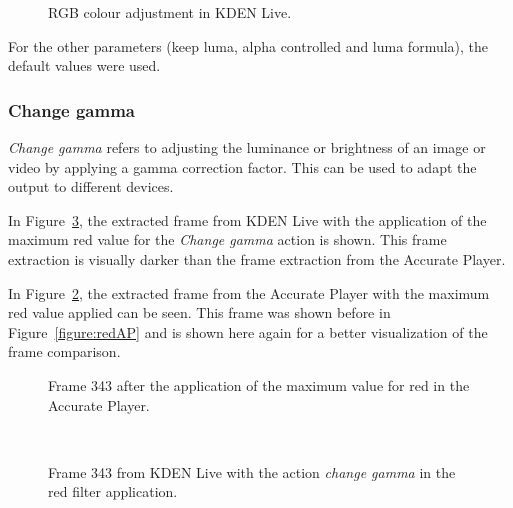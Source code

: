 \documentclass[../MasterThesis.tex]{subfiles}
\begin{document}
\begin{figure}[H]
	\begin{center}
		\caption[RGB colour adjustment in KDEN Live.]{RGB colour adjustment in KDEN Live.}
		\label{figure:kdenlive_rgb}
	\end{center}
\end{figure}


For the other parameters (keep luma, alpha controlled and luma formula), the default values were used.












\subsubsection*{Change gamma}

\textit{Change gamma} refers to adjusting the luminance or brightness of an image or video by applying a gamma correction factor. This can be used to adapt the output to different devices.~\cite{gamma}

In Figure~\ref{figure:gamma}, the extracted frame from KDEN Live with the application of the maximum red value for the \textit{Change gamma} action is shown. This frame extraction is visually darker than the frame extraction from the Accurate Player.

In Figure~\ref{figure:APframe1}, the extracted frame from the Accurate Player with the maximum red value applied can be seen. This frame was shown before in Figure~\ref{figure:redAP} and is shown here again for a better visualization of the frame comparison.

\begin{minipage}{0.48\textwidth}
	\begin{figure}[H]
		\begin{center}
			\caption[Frame 343 after the application of the red filter in the Accurate Player.]{Frame 343 after the application of the maximum value for red in the Accurate Player.}
			\label{figure:APframe1}
		\end{center}
	\end{figure}
\end{minipage}\begin{minipage}{0.04\textwidth}
	\ 
\end{minipage}\begin{minipage}{0.48\textwidth}
	\begin{figure}[H]
		\begin{center}
			\caption[Frame 343 from KDEN Live with the action \textit{change gamma}.]{Frame 343 from KDEN Live with the action \textit{change gamma} in the red filter application.}
			\label{figure:gamma}
		\end{center}
	\end{figure}
\end{minipage}
\vspace*{1em}
\end{document}

